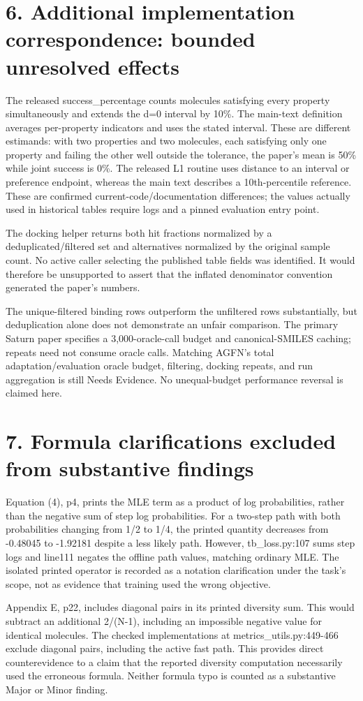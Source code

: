 \documentclass[10pt]{article}
\begin{document}
\section*{6. Additional implementation correspondence: bounded unresolved effects}
The released success\_percentage counts molecules satisfying every property simultaneously and extends the d=0 interval by 10\%. The main-text definition averages per-property indicators and uses the stated interval. These are different estimands: with two properties and two molecules, each satisfying only one property and failing the other well outside the tolerance, the paper’s mean is 50\% while joint success is 0\%. The released L1 routine uses distance to an interval or preference endpoint, whereas the main text describes a 10th-percentile reference. These are confirmed current-code/documentation differences; the values actually used in historical tables require logs and a pinned evaluation entry point.\par
The docking helper returns both hit fractions normalized by a deduplicated/filtered set and alternatives normalized by the original sample count. No active caller selecting the published table fields was identified. It would therefore be unsupported to assert that the inflated denominator convention generated the paper’s numbers.\par
The unique-filtered binding rows outperform the unfiltered rows substantially, but deduplication alone does not demonstrate an unfair comparison. The primary Saturn paper specifies a 3,000-oracle-call budget and canonical-SMILES caching; repeats need not consume oracle calls. Matching AGFN’s total adaptation/evaluation oracle budget, filtering, docking repeats, and run aggregation is still Needs Evidence. No unequal-budget performance reversal is claimed here.\par
\section*{7. Formula clarifications excluded from substantive findings}
Equation (4), p4, prints the MLE term as a product of log probabilities, rather than the negative sum of step log probabilities. For a two-step path with both probabilities changing from 1/2 to 1/4, the printed quantity decreases from -0.48045 to -1.92181 despite a less likely path. However, tb\_loss.py:107 sums step logs and line111 negates the offline path values, matching ordinary MLE. The isolated printed operator is recorded as a notation clarification under the task’s scope, not as evidence that training used the wrong objective.\par
Appendix E, p22, includes diagonal pairs in its printed diversity sum. This would subtract an additional 2/(N-1), including an impossible negative value for identical molecules. The checked implementations at metrics\_utils.py:449-466 exclude diagonal pairs, including the active fast path. This provides direct counterevidence to a claim that the reported diversity computation necessarily used the erroneous formula. Neither formula typo is counted as a substantive Major or Minor finding.\par
\end{document}
